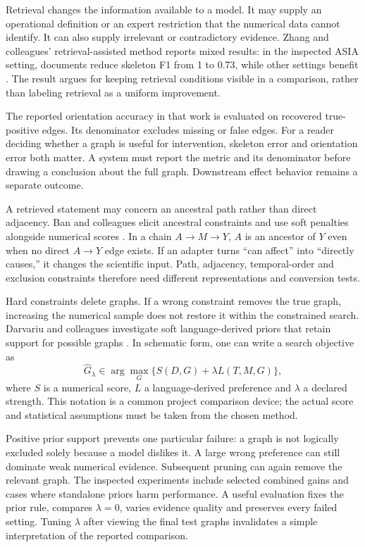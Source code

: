Retrieval changes the information available to a model. It may supply an
operational definition or an expert restriction that the numerical data cannot
identify. It can also supply irrelevant or contradictory evidence. Zhang and
colleagues' retrieval-assisted method reports mixed results: in the inspected
ASIA setting, documents reduce skeleton F1 from 1 to 0.73, while other settings
benefit \cite{v12_la_2402_15301}. The result argues for keeping retrieval
conditions visible in a comparison, rather than labeling retrieval as a
uniform improvement.

The reported orientation accuracy in that work is evaluated on recovered
true-positive edges. Its denominator excludes missing or false edges. For a
reader deciding whether a graph is useful for intervention, skeleton error and
orientation error both matter. A system must report the metric and its
denominator before drawing a conclusion about the full graph. Downstream
effect behavior remains a separate outcome.

A retrieved statement may concern an ancestral path rather than direct
adjacency. Ban and colleagues elicit ancestral constraints and use soft
penalties alongside numerical scores \cite{v12_la_2306_16902}. In a chain
$A\to M\to Y$, $A$ is an ancestor of $Y$ even when no direct $A\to Y$
edge exists. If an adapter turns ``can affect'' into ``directly causes,'' it
changes the scientific input. Path, adjacency, temporal-order and exclusion
constraints therefore need different representations and conversion tests.

Hard constraints delete graphs. If a wrong constraint removes the true graph,
increasing the numerical sample does not restore it within the constrained
search. Darvariu and colleagues investigate soft language-derived priors that
retain support for possible graphs \cite{v12_la_2405_13551}. In schematic
form, one can write a search objective as
\begin{equation}
 \widehat G_\lambda\in\arg\max_G
 \{S(D,G)+\lambda L(T,M,G)\},
 \label{eq:la03-soft-score}
\end{equation}
where $S$ is a numerical score, $L$ a language-derived preference and
$\lambda$ a declared strength. This notation is a common project comparison
device; the actual score and statistical assumptions must be taken from the
chosen method.

Positive prior support prevents one particular failure: a graph is not
logically excluded solely because a model dislikes it. A large wrong
preference can still dominate weak numerical evidence. Subsequent pruning can
again remove the relevant graph. The inspected experiments include selected
combined gains and cases where standalone priors harm performance. A useful
evaluation fixes the prior rule, compares $\lambda=0$, varies evidence quality
and preserves every failed setting. Tuning $\lambda$ after viewing the final
test graphs invalidates a simple interpretation of the reported comparison.

